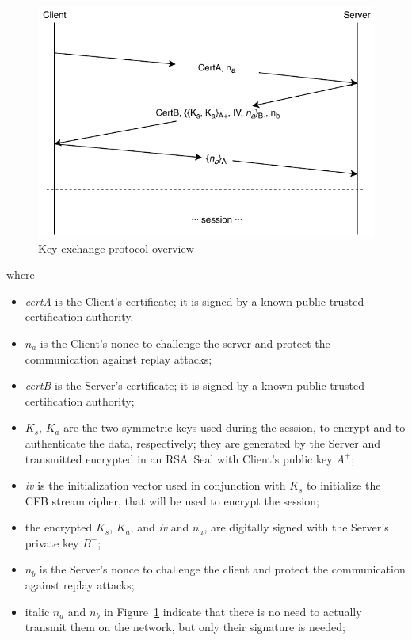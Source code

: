 \documentclass[a4paper,12pt]{article}
\begin{document}
\begin{figure}[H]
\centering
\includegraphics{img/key-exchange-protocol.pdf}
\caption{Key exchange protocol overview}
\label{img:key-exchange-protocol}
\end{figure}

where

\begin{itemize}
  \item \emph{certA} is the Client's certificate; it is signed by a known public trusted certification authority.
  \item $n_a$ is the Client's nonce to challenge the server and protect the communication against replay attacks;
  \item \emph{certB} is the Server's certificate; it is signed by a known public trusted certification authority;
  \item $K_s$, $K_a$ are the two symmetric keys used during the session, to encrypt and to authenticate the data, respectively; they are generated by the Server and transmitted encrypted in an RSA~Seal with Client's public key $A^{+}$;
  \item \emph{iv} is the initialization vector used in conjunction with $K_s$ to initialize the CFB stream cipher, that will be used to encrypt the session;
  \item the encrypted $K_s$, $K_a$, and \emph{iv} and $n_a$, are digitally signed with the Server's private key $B^{-}$;
  \item $n_b$ is the Server's nonce to challenge the client and protect the communication against replay attacks;
  \item italic $n_a$ and $n_b$ in Figure~\ref{img:key-exchange-protocol} indicate that there is no need to actually transmit them on the network, but only their signature is needed;
\end{itemize}
\end{document}
